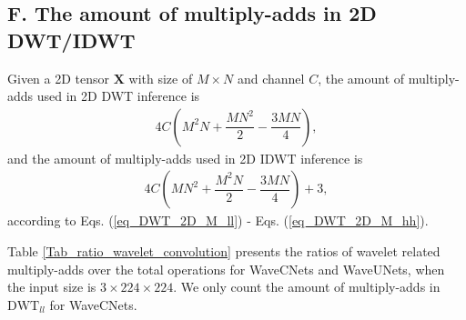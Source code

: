 \subsection*{F. The amount of multiply-adds in 2D DWT/IDWT}
Given a 2D tensor $\textbf{X}$ with size of $M\times N$ and channel $C$,
the amount of multiply-adds used in 2D DWT inference is
\begin{align}
\label{eq_no_2D_DWT}
4C\left(M^2N+\dfrac{MN^2}{2} - \dfrac{3MN}{4}\right),
\end{align}
and the amount of multiply-adds used in 2D IDWT inference is
\begin{align}
\label{eq_no_2D_IDWT}
4C\left(MN^2+\dfrac{M^2N}{2} - \dfrac{3MN}{4}\right) + 3,
\end{align}
according to Eqs. (\ref{eq_DWT_2D_M_ll}) - Eqs. (\ref{eq_DWT_2D_M_hh}).

Table \ref{Tab_ratio_wavelet_convolution} presents
the ratios of wavelet related multiply-adds over the total operations for WaveCNets and WaveUNets,
when the input size is $3\times224\times224$.
We only count the amount of multiply-adds in $\text{DWT}_{ll}$ for WaveCNets.
\begin{table}
\scriptsize
\caption{Wavelet related operation ratios.}
\label{Tab_ratio_wavelet_convolution}
\begin{center}
\end{center}
\end{table}
